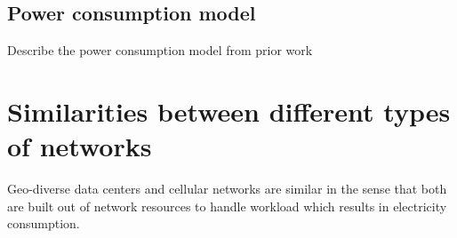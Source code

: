 \subsection{Power consumption model} Describe the power consumption model from prior work

\section{Similarities between different types of networks} Geo-diverse data centers and cellular networks are similar in the sense that both are built out of network resources to handle workload which results in electricity consumption. 